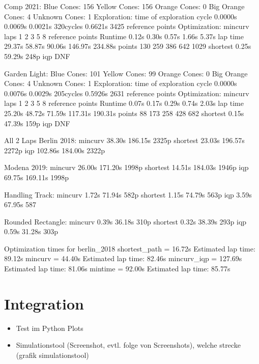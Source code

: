 Comp 2021:
Blue Cones: 156
Yellow Cones: 156
Orange Cones: 0
Big Orange Cones: 4
Unknown Cones: 1
Exploration:
time of exploration cycle
0.0000s 0.0069s 0.0021s 320cycles 0.6621s
3425 reference points
Optimization:
mincurv laps 1 2 3 5 8
reference points
Runtime 0.12s 0.30s 0.57s 1.66s 5.37s
lap time 29.37s 58.87s 90.06s 146.97s 234.88s
points 130 259 386 642 1029
shortest 0.25s 59.29s 248p
iqp DNF


Garden Light:
Blue Cones: 101
Yellow Cones: 99
Orange Cones: 0
Big Orange Cones: 4
Unknown Cones: 1
Exploration:
time of exploration cycle
0.0000s 0.0076s 0.0029s 205cycles 0.5926s
2631 reference points
Optimization:
mincurv laps 1 2 3 5 8
reference points
Runtime 0.07s 0.17s 0.29s 0.74s 2.03s
lap time 25.20s 48.72s 71.59s 117.31s 190.31s
points 88 173 258 428 682
shortest 0.15s 47.39s 159p
iqp DNF

All 2 Laps
Berlin 2018:
mincurv 38.30s 186.15s 2325p
shortest 23.03s 196.57s 2272p
iqp 102.86s 184.00s 2322p

Modena 2019:
mincurv 26.00s 171.20s 1998p
shortest 14.51s 184.03s 1946p
iqp 69.75s 169.11s 1998p

Handling Track:
mincurv 1.72s 71.94s 582p
shortest 1.15s 74.79s 563p
iqp 3.59s 67.95s 587

Rounded Rectangle:
mincurv 0.39s 36.18s 310p
shortest 0.32s 38.39s 293p
iqp 0.59s 31.28s 303p

Optimization times for berlin\_2018
shortest\_path = 16.72s
Estimated lap time: 89.12s
mincurv = 44.40s
Estimated lap time: 82.46s
mincurv\_iqp = 127.69s
Estimated lap time: 81.06s
mintime = 92.00s
Estimated lap time: 85.77s

\section{Integration}
\begin{itemize}
    \item Test im Python Plots
    \item Simulationstool (Screenshot, evtl. folge von Screenshots), welche strecke (grafik simulationstool)
\end{itemize}

